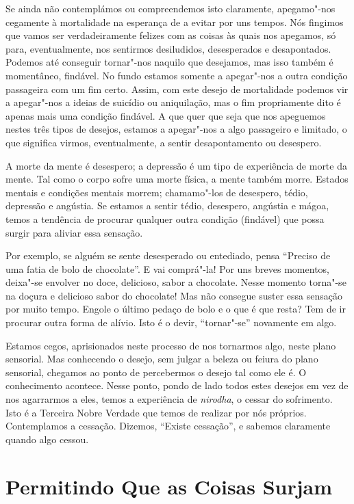 Se ainda não contemplámos ou compreendemos isto claramente, apegamo"-nos
cegamente à mortalidade na esperança de a evitar por uns tempos. Nós fingimos
que vamos ser verdadeiramente felizes com as coisas às quais nos apegamos, só
para, eventualmente, nos sentirmos desiludidos, desesperados e desapontados.
Podemos até conseguir tornar"-nos naquilo que desejamos, mas isso também é
momentâneo, findável. No fundo estamos somente a apegar"-nos a outra condição
passageira com um fim certo. Assim, com este desejo de mortalidade podemos vir a
apegar"-nos a ideias de suicídio ou aniquilação, mas o fim propriamente dito é
apenas mais uma condição findável. A que quer que seja que nos apeguemos nestes
três tipos de desejos, estamos a apegar"-nos a algo passageiro e limitado, o que
significa virmos, eventualmente, a sentir desapontamento ou desespero.

A morte da mente é desespero; a depressão é um tipo de experiência de morte da
mente. Tal como o corpo sofre uma morte física, a mente também morre. Estados
mentais e condições mentais morrem; chamamo"-los de desespero, tédio, depressão e
angústia. Se estamos a sentir tédio, desespero, angústia e mágoa, temos a
tendência de procurar qualquer outra condição (findável) que possa surgir para
aliviar essa sensação.

Por exemplo, se alguém se sente desesperado ou entediado, pensa “Preciso de uma
fatia de bolo de chocolate”. E vai comprá"-la! Por uns breves momentos, deixa"-se
envolver no doce, delicioso, sabor a chocolate. Nesse momento torna"-se na doçura
e delicioso sabor do chocolate! Mas não consegue suster essa sensação por muito
tempo. Engole o último pedaço de bolo e o que é que resta? Tem de ir procurar
outra forma de alívio. Isto é o devir, “tornar"-se” novamente em algo.

Estamos cegos, aprisionados neste processo de nos tornarmos algo, neste plano
sensorial. Mas conhecendo o desejo, sem julgar a beleza ou feiura do plano
sensorial, chegamos ao ponto de percebermos o desejo tal como ele é. O
conhecimento acontece. Nesse ponto, pondo de lado todos estes desejos em vez de
nos agarrarmos a eles, temos a experiência de \emph{nirodha}, o cessar do
sofrimento. Isto é a Terceira Nobre Verdade que temos de realizar por nós
próprios. Contemplamos a cessação. Dizemos, “Existe cessação”, e sabemos
claramente quando algo cessou.

\section{Permitindo Que as Coisas Surjam}

